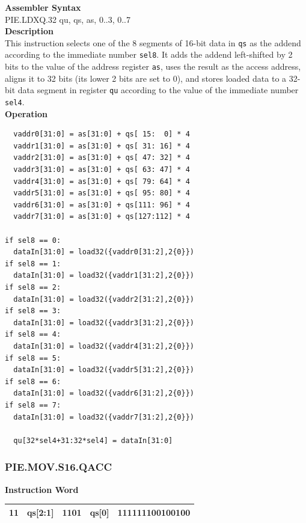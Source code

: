 \textbf{Assembler Syntax} \\
PIE.LDXQ.32 qu, qs, as, 0..3, 0..7 \\
\textbf{Description} \\
This instruction selects one of the 8 segments of 16-bit data in \lstinline{qs} as the addend according to the immediate number \lstinline{sel8}. It adds the addend left-shifted by 2 bits to the value of the address register \lstinline{as}, uses the result as the access address, aligns it to 32 bits (its lower 2 bits are set to 0), and stores loaded data to a 32-bit data segment in register \lstinline{qu} according to the value of the immediate number \lstinline{sel4}. \\
\textbf{Operation}
\begin{lstlisting}
  vaddr0[31:0] = as[31:0] + qs[ 15:  0] * 4
  vaddr1[31:0] = as[31:0] + qs[ 31: 16] * 4
  vaddr2[31:0] = as[31:0] + qs[ 47: 32] * 4
  vaddr3[31:0] = as[31:0] + qs[ 63: 47] * 4
  vaddr4[31:0] = as[31:0] + qs[ 79: 64] * 4
  vaddr5[31:0] = as[31:0] + qs[ 95: 80] * 4
  vaddr6[31:0] = as[31:0] + qs[111: 96] * 4
  vaddr7[31:0] = as[31:0] + qs[127:112] * 4

if sel8 == 0:
  dataIn[31:0] = load32({vaddr0[31:2],2{0}})
if sel8 == 1:
  dataIn[31:0] = load32({vaddr1[31:2],2{0}})
if sel8 == 2:
  dataIn[31:0] = load32({vaddr2[31:2],2{0}})
if sel8 == 3:
  dataIn[31:0] = load32({vaddr3[31:2],2{0}})
if sel8 == 4:
  dataIn[31:0] = load32({vaddr4[31:2],2{0}})
if sel8 == 5:
  dataIn[31:0] = load32({vaddr5[31:2],2{0}})
if sel8 == 6:
  dataIn[31:0] = load32({vaddr6[31:2],2{0}})
if sel8 == 7:
  dataIn[31:0] = load32({vaddr7[31:2],2{0}})

  qu[32*sel4+31:32*sel4] = dataIn[31:0]
\end{lstlisting}

\newpage
\subsubsection{PIE.MOV.S16.QACC}\label{instruction:PIEMOVS16QACC}
\setlength\tabcolsep{6pt}
\textbf{Instruction Word} \\
\begin{tabular}{|c|c|c|c|c|}
	\hline
	11 & qs[2:1] & 1101 & qs[0] & 111111100100100 \\
	\hline
\end{tabular}

